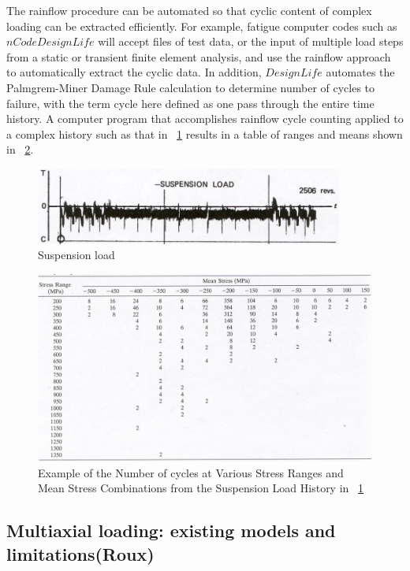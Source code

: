 \documentclass[3p,times,procedia,number]{elsarticle}
\newcommand{\figref}[1]{\figurename~\ref{#1}}
\begin{document}
The rainflow procedure can be automated so that cyclic content of complex loading can be extracted efficiently.  For example, fatigue computer codes such as $nCode DesignLife$ will accept files of test data, or the input of multiple load steps from a static or transient finite element analysis, and use the rainflow approach to automatically extract the cyclic data.  In addition, $DesignLife$ automates the Palmgrem-Miner Damage Rule calculation to determine number of cycles to failure, with the term cycle here defined as one pass through the entire time history. A computer program that accomplishes rainflow cycle counting applied to a complex history such as that in \figref{loadhistory} results in a table of ranges and means shown in \figref{loadhistory1}.

\begin{figure}[h!]
	\centering
	\includegraphics[width=0.9\textwidth]{figures//loadhistory.png} 
	\caption{Suspension load}
	\label{loadhistory}
\end{figure}

\begin{figure}[h!]
	\centering
	\includegraphics[width=\textwidth]{figures//loadhistory1.png} 
	\caption{Example of the Number of cycles at Various Stress Ranges and Mean Stress Combinations from the Suspension Load History in \figref{loadhistory}}
	\label{loadhistory1}
\end{figure}


\subsection{Multiaxial loading: existing models and limitations(Roux)}
\end{document}
